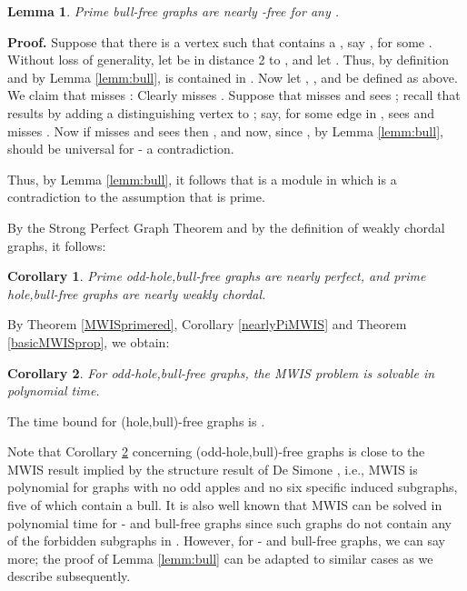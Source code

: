 \documentclass[11pt]{article}
\newcommand{\qed}{\hfill }
\newcommand{\0}{\text{ has a co-join to }}
\newcommand{\1}{\text{ has a join to }}
\newtheorem{lemm}{Lemma}
\newtheorem{coro}{Corollary}
\begin{document}
\begin{lemm}\label{lemm:bullnearlycoCkfr}
Prime bull-free graphs are nearly -free for any .
\end{lemm}

\noindent 
{\bf Proof.} Suppose that there is a vertex  such that  contains a , say , for some . Without loss of generality, let  be in distance 2 to , and let . Thus, by definition and by Lemma \ref{lemm:bull},  is contained in . Now let , , and  be defined as above. We claim that  misses : Clearly  misses . Suppose that  misses  and sees ; recall that  results by adding a distinguishing vertex  to ; say, for some edge  in ,  sees  and misses . Now if  misses  and sees  then , and now, since , by Lemma \ref{lemm:bull},  should be universal for  - a contradiction.     

Thus, by Lemma \ref{lemm:bull}, it follows that  is a module in  which is a contradiction to the assumption that  is prime.   
\qed

\medskip

By the Strong Perfect Graph Theorem and by the definition of weakly chordal graphs, it follows:

\begin{coro}\label{holebullfrnearlywc}
Prime odd-hole,bull-free graphs are nearly perfect, and prime hole,bull-free graphs are nearly weakly chordal.
\end{coro}

By Theorem \ref{MWISprimered}, Corollary \ref{nearlyPiMWIS} and Theorem \ref{basicMWISprop}, we obtain: 

\begin{coro}\label{holebullfrMWIS}
For odd-hole,bull-free graphs, the MWIS problem is solvable in polynomial time. 
\end{coro}

The time bound for (hole,bull)-free graphs is .

\medskip

Note that Corollary \ref{holebullfrMWIS} concerning (odd-hole,bull)-free graphs is close to the MWIS result implied by the structure result of De Simone \cite{DeSim1993}, i.e., MWIS is polynomial for graphs with no odd apples and no six specific induced subgraphs, five of which contain a bull. It is also well known that MWIS can be solved in polynomial time for - and bull-free graphs since such graphs do not contain any of the forbidden subgraphs in \cite{DeSim1993}.
However, for - and bull-free graphs, we can say more; the proof of Lemma \ref{lemm:bull} can be adapted to similar cases as we describe subsequently.   
\end{document}

